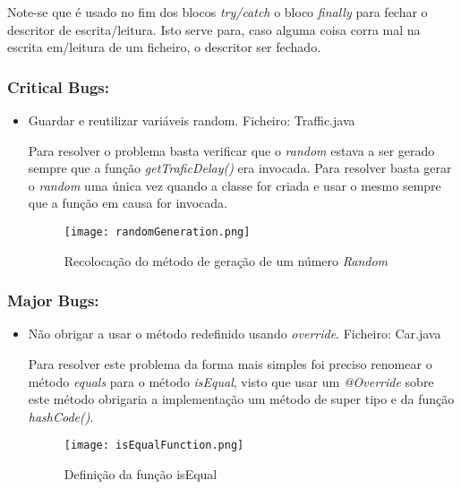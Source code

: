Note-se que é usado no fim dos blocos \textit{try/catch} o bloco \textit{finally} para fechar o descritor de 
escrita/leitura. Isto serve para, caso alguma coisa corra mal na escrita em/leitura de um ficheiro, o 
descritor ser fechado. 

\subsubsection{Critical Bugs:}
\begin{itemize}
\item Guardar e reutilizar variáveis random.\newline
 Ficheiro: Traffic.java \newline


\par Para resolver o problema basta verificar que o \textit{random} estava a ser gerado sempre que a função \textit{getTraficDelay()} era invocada. Para resolver basta gerar o \textit{random} uma única vez quando a classe for criada e usar o mesmo sempre que a função em causa for invocada.

\begin{figure}[H]

  \centering

  \texttt{[image: randomGeneration.png]}

  \caption {Recolocação do método de geração de um número \textit{Random}}

  \label {fig06}

\end{figure}
\end{itemize}

\subsubsection{Major Bugs:}
\begin{itemize}
\item Não obrigar a usar o método redefinido usando \textit{override}.\newline
 Ficheiro: Car.java\newline

\par Para resolver este problema da forma mais simples foi preciso renomear o método \textit{equals} para o método \textit{isEqual}, visto que usar um \textit{@Override} sobre este método obrigaria a implementação um método de super tipo e da função \textit{hashCode()}.


\begin{figure}[H]

  \centering

  \texttt{[image: isEqualFunction.png]}

  \caption {Definição da função isEqual}

  \label {fig07}

\end{figure}

\end{itemize}


